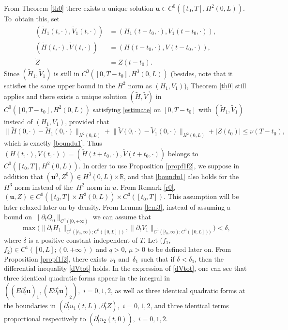 \documentclass[11pt]{article}
\numberwithin{equation}{section}
\theoremstyle{definition}
\begin{document}
From Theorem \ref{th0} there exists a unique solution $\boldsymbol{u}\in C^{0}([{t_{0}},T],H^{2}(0,L))$.
To~obtain this, set
\begin{align*}
(\widetilde{H}_{1}(t,\cdot), \widetilde{V}_{1}(t,\cdot)) &= (H_{1}(t-t_{0},\cdot), V_{1}(t-t_{0},\cdot)), \\
(\widetilde{H}(t,\cdot), \widetilde{V}(t,\cdot)) &= (H(t-t_{0},\cdot), V(t-t_{0},\cdot)),\\
\widetilde{Z} &= Z(t-t_{0}). 
\end{align*}
Since $(\widetilde{H}_{1}, \widetilde{V}_{1})$ is still in $C^{0}([0,T-t_{0}], H^{3}(0,L))$ (besides, note that it satisfies the same upper bound in the $H^{2}$ norm as $(H_{1}, V_{1})$), Theorem \ref{th0} still applies and there exists a unique solution $(\widetilde{H},\widetilde{V})$ in $C^{0}([0,T-t_{0}],H^{2}(0,L))$ satisfying \eqref{estimate} on $[0,T-t_{0}]$ with $(\widetilde{H}_{1}, \widetilde{V}_{1})$ instead of $(H_{1}, V_{1})$, provided that
\begin{equation*}
\lVert \widetilde{H}(0,\cdot)-\widetilde{H}_{1}(0,\cdot)\rVert_{H^{2}(0,L)}+\lVert \widetilde{V}(0,\cdot)-\widetilde{V}_{1}(0,\cdot)\rVert_{H^{2}(0,L)}+|Z(t_{0})|\leq \nu(T-t_{0}),
\end{equation*}
which is exactly \eqref{boundu1}. Thus $(H(t,\cdot), V(t,\cdot)) = (\widetilde{H}(t+t_{0},\cdot), \widetilde{V}(t+t_{0},\cdot))$ belongs to $C^{0}([t_{0},T],H^{2}(0,L))$.
In order to use Proposition \ref{propf1f2}, we suppose in addition that $(\boldsymbol{u}^{0},Z^{0})\in H^{3}(0,L){\times\mathbb{R}}$, and that \eqref{boundu1} also holds for the $H^{3}$ norm instead of the~$H^{2}$ norm in $u$. From Remark \ref{r0},
$(\boldsymbol{u},Z)\!\in\! C^{0}([{t_{0}},T]\times H^{3}(0,L))\times C^{3}([{t_{0}},T])$. This assumption will be later relaxed later on by density. From Lemma \ref{lem3}, instead of assuming a bound on $\|\partial_{t} Q_{0}\|_{C^{3}([0,+\infty)}$ we can assume that
\begin{equation}
\max\bigl(\lVert\partial_{t}H_{1}\rVert_{C^{1}([t_{0},\infty);{C^{0}([0,L])})},\lVert\partial_{t}V_{1}\rVert_{C^{1}([t_{0},\infty);{C^{0}([0,L])})}\bigr)<\delta,
\label{boundHV}
\end{equation}
where $\delta$ is a positive constant {independent of $T$}. Let $(f_{1}$, $f_{2})\in C^{1}([0,L];(0,+\infty))$ and $q>0$, $\mu>0$ to be defined later on. From Proposition \ref{propf1f2}, there exists~$\nu_{1}$ and~$\delta_{1}$ such that if $\delta<\delta_{1}$, then the differential inequality \eqref{dVtot} holds.
In the expression of \eqref{dVtot}, one can see that three identical quadratic forms appear in the integral in $((E\partial_{t}^{i}\boldsymbol{u})_{1},(E\partial_{t}^{i}\boldsymbol{u})_{2}),$ $i=0,1,2$, as well as three identical quadratic forms at the boundaries in $(\partial_{t}^{i}u_{1}(t,L),\partial_{t}^{i}Z),$ $i=0,1,2$, and three identical terms proportional respec\-tively to $(\partial_{t}^{i}u_{2}(t,0)),$ $i=0,1,2$.
\end{document}
